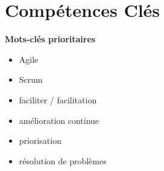 \documentclass[11pt,a4paper]{article}
\newcommand{\skilltitle}[1]{\normalsize\textcolor{primaryblue}{\textbf{#1}}}
\begin{document}
\section*{Compétences Clés}

\skilltitle{Mots-clés prioritaires}
\begin{itemize}[leftmargin=10pt]
    \item Agile
    \item Scrum
    \item faciliter / facilitation
    \item amélioration continue
    \item priorisation
    \item résolution de problèmes
\end{itemize}
\end{document}
